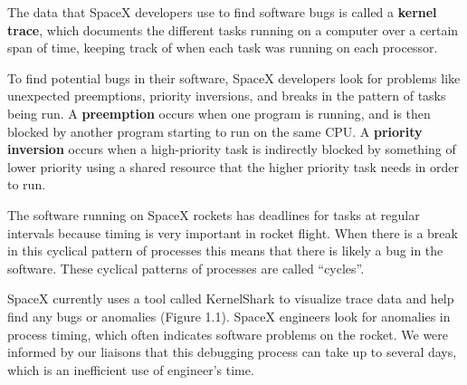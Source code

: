 \documentclass{hmcclinic}
\begin{document}
The data that SpaceX developers use to find software bugs is called
a {\bf kernel trace}, which documents the different tasks running on a computer over a
certain span of time, keeping track of when each task was running on each processor. 

To find potential bugs in their software, SpaceX developers look for
problems like unexpected preemptions, priority inversions, and breaks in the
pattern of tasks being run.
 A {\bf preemption} occurs when one program is running, and
is then blocked by another program starting to run on the same CPU. 
A {\bf priority
inversion} occurs when a high-priority task is indirectly blocked by something of
lower priority using a shared resource that the higher priority task needs in
order to run. 

The software running on SpaceX rockets has deadlines for tasks at regular intervals because timing is very important in rocket flight. When there is a break in this cyclical pattern of processes this means that there is likely a bug in the software. These cyclical patterns of processes are called ``cycles''.

SpaceX currently uses a tool called KernelShark %
to visualize trace data and help find any bugs or anomalies (Figure 1.1). 
SpaceX engineers look for anomalies in process timing, which often indicates 
software problems on the rocket. We were informed by our liaisons that this
 debugging process can take up to several days, 
which is an inefficient use of engineer's time. \\
\end{document}
